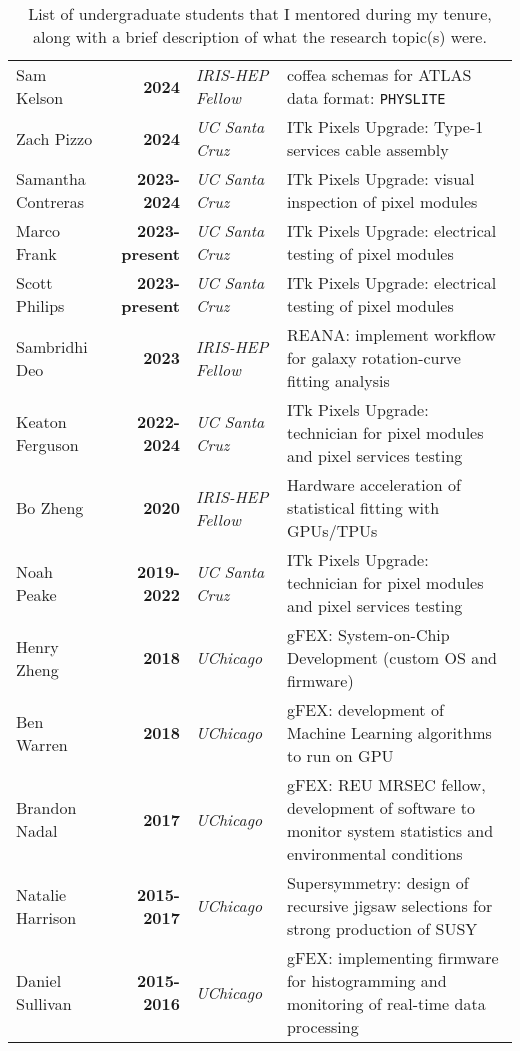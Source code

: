 \begin{table}[h!]
	\footnotesize
	\centering
	\caption{List of undergraduate students that I mentored during my tenure, along with a brief description of what the research topic(s) were.}
	\begin{tabular}{l|>{\bfseries}r|>{\itshape}l|p{20em}}
		Sam Kelson         & 2024         & IRIS-HEP Fellow & coffea schemas for ATLAS data format: \texttt{PHYSLITE}                                                   \\
		Zach Pizzo         & 2024         & UC Santa Cruz   & ITk Pixels Upgrade: Type-1 services cable assembly                                                        \\
		Samantha Contreras & 2023-2024    & UC Santa Cruz   & ITk Pixels Upgrade: visual inspection of pixel modules                                                    \\
		Marco Frank        & 2023-present & UC Santa Cruz   & ITk Pixels Upgrade: electrical testing of pixel modules                                                   \\
		Scott Philips      & 2023-present & UC Santa Cruz   & ITk Pixels Upgrade: electrical testing of pixel modules                                                   \\
		Sambridhi Deo      & 2023         & IRIS-HEP Fellow & REANA: implement workflow for galaxy rotation-curve fitting analysis                                      \\
		Keaton Ferguson    & 2022-2024    & UC Santa Cruz   & ITk Pixels Upgrade: technician for pixel modules and pixel services testing                               \\
		Bo Zheng           & 2020         & IRIS-HEP Fellow & Hardware acceleration of statistical fitting with GPUs/TPUs                                               \\
		Noah Peake         & 2019-2022    & UC Santa Cruz   & ITk Pixels Upgrade: technician for pixel modules and pixel services testing                               \\
		Henry Zheng        & 2018         & UChicago        & gFEX: System-on-Chip Development (custom OS and firmware)                                                 \\
		Ben Warren         & 2018         & UChicago        & gFEX: development of Machine Learning algorithms to run on GPU                                            \\
		Brandon Nadal      & 2017         & UChicago        & gFEX: REU MRSEC fellow, development of software to monitor system statistics and environmental conditions \\
		Natalie Harrison   & 2015-2017    & UChicago        & Supersymmetry: design of recursive jigsaw selections for strong production of SUSY                        \\
		Daniel Sullivan    & 2015-2016    & UChicago        & gFEX: implementing firmware for histogramming and monitoring of real-time data processing                 \\
	\end{tabular}
\end{table}

